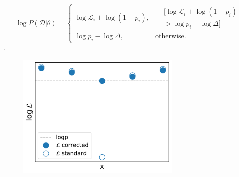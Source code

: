 \documentclass{beamer}
\begin{document}
\begin{frame}
\begin{equation}
    \log{P(\mathcal{D}|\theta)} =  
    \begin{cases}
        \log \mathcal{L}_i + \log (1-p_i), &
    \begin{aligned}
        &[\log{\mathcal{L}_i} + \log({1-p_i}) \\
        &> \log p_i - \log \Delta]
    \end{aligned}\\ 
        \log p_i - \log \Delta, & \text{otherwise}.
    \end{cases}
    \label{eqn:loglcompute}
\end{equation}.
\begin{figure}
	\includegraphics[width=0.7\textwidth]{theory_sketch.pdf}
\end{figure}
\end{frame}
\end{document}
